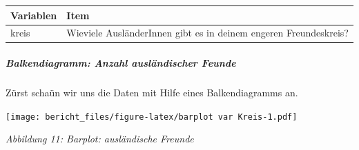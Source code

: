 \documentclass[]{article}
\newenvironment{Shaded}{\begin{snugshade}}{\end{snugshade}}
\newcommand{\KeywordTok}[1]{\textcolor[rgb]{0.13,0.29,0.53}{\textbf{{#1}}}}
\newcommand{\DataTypeTok}[1]{\textcolor[rgb]{0.13,0.29,0.53}{{#1}}}
\newcommand{\DecValTok}[1]{\textcolor[rgb]{0.00,0.00,0.81}{{#1}}}
\newcommand{\StringTok}[1]{\textcolor[rgb]{0.31,0.60,0.02}{{#1}}}
\newcommand{\NormalTok}[1]{{#1}}
\let\oldsubparagraph\subparagraph
\renewcommand{\subparagraph}[1]{\oldsubparagraph{#1}\mbox{}}
\begin{document}
\begin{longtable}[]{@{}ll@{}}
\toprule
\begin{minipage}[b]{0.09\columnwidth}\raggedright\strut
Variablen\strut
\end{minipage} & \begin{minipage}[b]{0.85\columnwidth}\raggedright\strut
Item\strut
\end{minipage}\tabularnewline
\midrule
\endhead
\begin{minipage}[t]{0.09\columnwidth}\raggedright\strut
kreis\strut
\end{minipage} & \begin{minipage}[t]{0.85\columnwidth}\raggedright\strut
Wieviele AusländerInnen gibt es in deinem engeren Freundeskreis?\strut
\end{minipage}\tabularnewline
\bottomrule
\end{longtable}

\subparagraph{Balkendiagramm: Anzahl ausländischer
Feunde}\label{balkendiagramm-anzahl-auslandischer-feunde}

Zürst schaün wir uns die Daten mit Hilfe eines Balkendiagramms an.

\begin{Shaded}
\end{Shaded}

\texttt{[image: bericht\_files/figure-latex/barplot var Kreis-1.pdf]}

\begin{center}
\textit{Abbildung 11: Barplot: ausländische Freunde}
\bigskip
\end{center}
\end{document}
